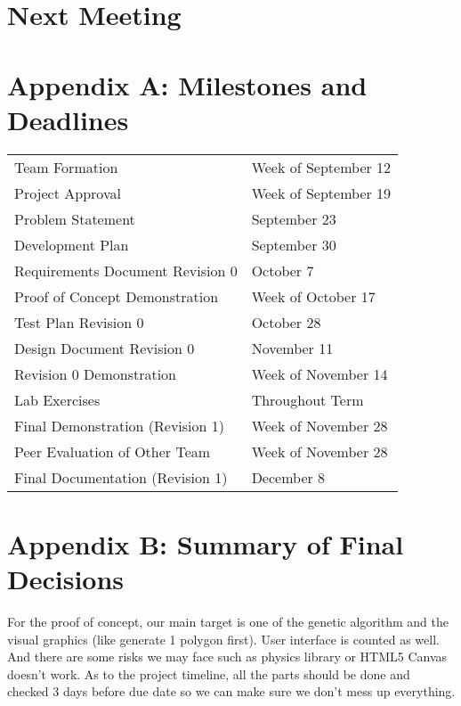 \documentclass[11pt]{meetingmins}
\begin{document}
\section{Next Meeting}
	\vspace{1em}

\newpage
\section{Appendix A: Milestones and Deadlines}
\begin{tabular}{ p{6.7cm} l}

  Team Formation & Week of September 12\\

  Project Approval & Week of September 19\\

  Problem Statement & September 23\\

  Development Plan & September 30\\

  Requirements Document Revision 0 & October 7\\

  Proof of Concept Demonstration & Week of October 17\\

  Test Plan Revision 0 & October 28\\

  Design Document Revision 0 & November 11\\

  Revision 0 Demonstration & Week of November 14\\

  Lab Exercises & Throughout Term\\

  Final Demonstration (Revision 1) & Week of November 28\\

  Peer Evaluation of Other Team & Week of November 28\\

  Final Documentation (Revision 1) & December 8\\

\end{tabular}

\newpage
\section{Appendix B: Summary of Final Decisions}
	For the proof of concept, our main target is one of the genetic algorithm and the visual graphics (like generate 1 polygon first). User interface is counted as well. And there are some risks we may face such as physics library or HTML5 Canvas doesn't work. As to the project timeline, all the parts should be done and checked 3 days before due date so we can make sure we don't mess up everything.
\end{document}
